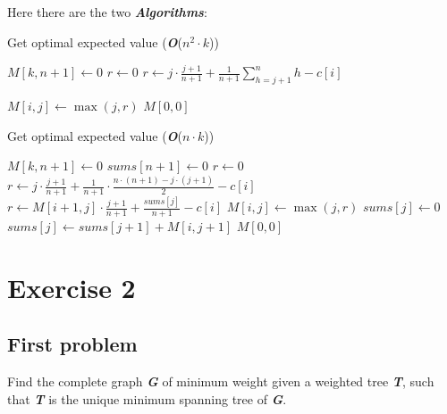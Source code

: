 \documentclass[11pt]{article}
\begin{document}
Here there are the two \textbf{\textit{Algorithms}}:

\begin{minipage}[t]{0.49\textwidth}
\begin{algorithm}[H]
	\caption{Get optimal expected value (\textbf{\textit{O}}($n^2 \cdot k$))}\label{euclid}
	\begin{algorithmic}[1]
		\State $M[k, n+1] \gets 0$
		\State $r \gets 0$
		\State $r \gets j \cdot \frac{j+1}{n+1} + \frac{1}{n+1}\sum\limits_{h = j + 1}^n{h} - c[i]$
		\Else
		\State \begin{varwidth}[t]{\linewidth} $r \gets M[i+1, j] \cdot \frac{j+1}{n+1} + \frac{1}{n+1} \cdot$ \par
			\hskip\algorithmicindent $\sum\limits_{h = j + 1}^n{M[i+1, h]} - c[i]$
		\end{varwidth}
		\EndIf
		\State $M[i, j] \gets \max(j, r)$
		\EndFor		
		\EndFor
		\State \Return $M[0, 0]$
	\end{algorithmic}
\end{algorithm}
\end{minipage}
\hfill
\begin{minipage}[t]{0.49\textwidth}
\begin{algorithm}[H]
	\caption{Get optimal expected value (\textbf{\textit{O}}($n \cdot k$))}\label{euclid}
	\begin{algorithmic}[1]
		\State $M[k, n+1] \gets 0$
		\State $sums[n+1] \gets 0$
		\State $r \gets 0$
			\State $r \gets j \cdot \frac{j+1}{n+1} + \frac{1}{n+1} \cdot \frac{n \cdot (n+1)-j \cdot (j+1)}{2} - c[i]$
		\Else
			\State $r \gets M[i+1, j] \cdot \frac{j+1}{n+1} + \frac{sums[j]}{n+1} - c[i]$
		\EndIf
		\State $M[i, j] \gets \max(j, r)$
			\State $sums[j] \gets 0$
		\Else
			\State $sums[j] \gets sums[j+1] + M[i, j+1]$
		\EndIf
		\EndFor		
		\EndFor
		\State \Return $M[0, 0]$
	\end{algorithmic}
\end{algorithm}
\end{minipage}
\newpage

\section*{Exercise 2}
\subsection*{First problem}
Find the complete graph \textbf{\textit{G}} of minimum weight given a weighted tree \textbf{\textit{T}}, such that  \textbf{\textit{T}} is the unique minimum spanning tree of \textbf{\textit{G}}.
\end{document}
